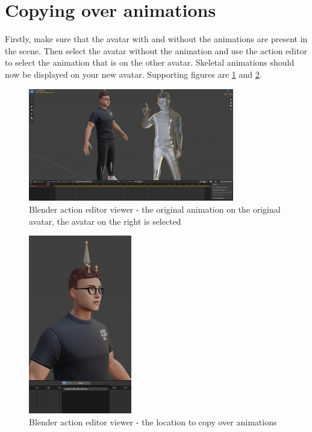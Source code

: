 \documentclass{uva-inf-article}
\begin{document}
\section{Copying over animations}
Firstly, make sure that the avatar with and without the animations are present in the scene. Then select the avatar without the animation and use the action editor to select the animation that is on the other avatar. Skeletal animations should now be displayed on your new avatar. Supporting figures are \ref{fig:anim1} and \ref{fig:anim2}.
\begin{figure}[hbt!]
    \centering
    \includegraphics[width=0.8\textwidth]{imgs/copyingAnims/Anim1.png}
    \caption{Blender action editor viewer - the original animation on the original avatar, the avatar on the right is selected }
    \label{fig:anim1}
\end{figure}
\begin{figure}[hbt!]
    \centering
    \includegraphics[width=0.4\textwidth]{imgs/copyingAnims/Anim2.png}
    \caption{Blender action editor viewer - the location to copy over animations }
    \label{fig:anim2}
\end{figure}
\end{document}
